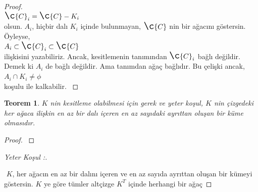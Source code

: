 \documentclass[11pt]{amsbook}
\newtheorem{theorem}{Teorem}[section]
\newenvironment{yeterkosul}[1][Yeter Koşul :]{%
	\begin{proof}[#1]$ $\par\nobreak\ignorespaces
	}{%
	\end{proof}
}
\begin{document}
	
	\bigskip
	\begin{proof}
		$ $\newline\\
		\indent\indent\indent
		$\Large \c{C}_i = \c{C} - K_i$
		$ $\newline\\
		olsun. $A_i$, hiçbir dalı $K_i$ içinde bulunmayan,
		$\Large\c{C}$ nin bir ağacını göstersin. Öyleyse,
		$ $\newline\\
		\indent\indent\indent
		$A_i \subset \Large\c{C}_i \subset \c{C}$
		$ $\newline\\
		ilişkisini yazabiliriz. Ancak, kesitlemenin tanımından
		$\Large\c{C}_i$ bağlı değildir. Demek ki $A_i$ de bağlı değildir.
		Ama tanımdan ağaç bağlıdır. Bu çelişki ancak,
		$ $\newline\\
		\indent\indent\indent
		$A_i \cap K_i \neq \phi$
		$ $\newline\\
		koşulu ile kalkabilir.
		$ $\newline
	\end{proof}
	\begin{theorem}
		$K$ nin kesitleme olabilmesi için gerek ve yeter koşul, $K$ nin
		çizgedeki her ağaca ilişkin en az bir dalı içeren en az sayıdaki
		ayrıttan oluşan bir küme olmasıdır.
		$ $\newline
	\end{theorem}
	\begin{proof}
		$ $\newline
	\end{proof}
	\begin{yeterkosul}
		$ $\newline
		$K$, her ağacın en az bir dalını içeren ve en az sayıda
		ayrıttan oluşan bir kümeyi göstersin. $K$ ye göre tümler altçizge
		$K^T$ içinde herhangi bir ağaç
	\end{yeterkosul}
\end{document}
